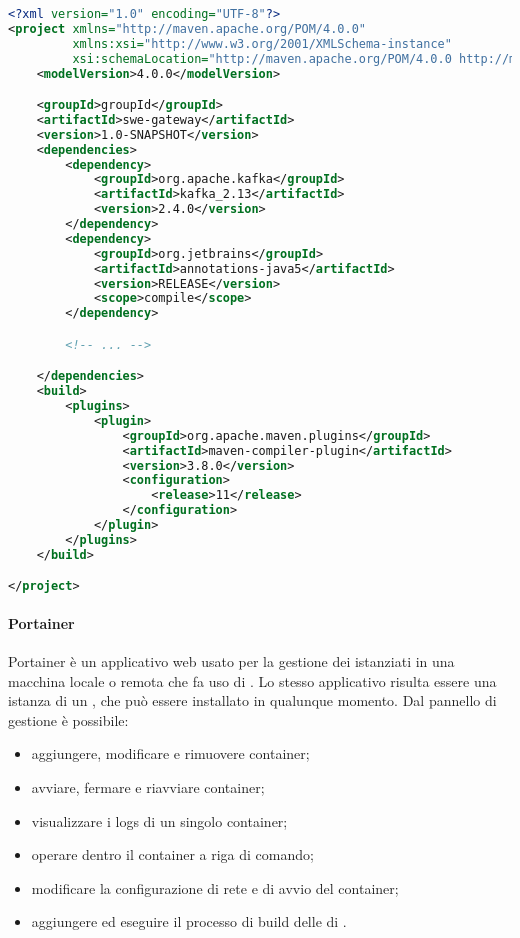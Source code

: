					\begin{lstlisting}[language=xml,captionpos=b,caption={Esempio di implementazione di un file pom.xml}]
<?xml version="1.0" encoding="UTF-8"?>
<project xmlns="http://maven.apache.org/POM/4.0.0"
         xmlns:xsi="http://www.w3.org/2001/XMLSchema-instance"
         xsi:schemaLocation="http://maven.apache.org/POM/4.0.0 http://maven.apache.org/xsd/maven-4.0.0.xsd">
    <modelVersion>4.0.0</modelVersion>

    <groupId>groupId</groupId>
    <artifactId>swe-gateway</artifactId>
    <version>1.0-SNAPSHOT</version>
    <dependencies>
        <dependency>
            <groupId>org.apache.kafka</groupId>
            <artifactId>kafka_2.13</artifactId>
            <version>2.4.0</version>
        </dependency>
        <dependency>
            <groupId>org.jetbrains</groupId>
            <artifactId>annotations-java5</artifactId>
            <version>RELEASE</version>
            <scope>compile</scope>
        </dependency>

        <!-- ... -->

    </dependencies>
    <build>
        <plugins>
            <plugin>
                <groupId>org.apache.maven.plugins</groupId>
                <artifactId>maven-compiler-plugin</artifactId>
                <version>3.8.0</version>
                <configuration>
                    <release>11</release>
                </configuration>
            </plugin>
        </plugins>
    </build>

</project>\end{lstlisting}

				\paragraph{Portainer}
					Portainer è un applicativo web usato per la gestione dei  istanziati in una macchina locale o remota che fa uso di . Lo stesso applicativo risulta essere una istanza di un , che può essere installato in qualunque momento. Dal pannello di gestione è possibile:
					\begin{itemize}
						\item aggiungere, modificare e rimuovere container;
						\item avviare, fermare e riavviare container;
						\item visualizzare i logs di un singolo container;
						\item operare dentro il container a riga di comando;
						\item modificare la configurazione di rete e di avvio del container;
						\item aggiungere ed eseguire il processo di build delle  di . 
					\end{itemize}

